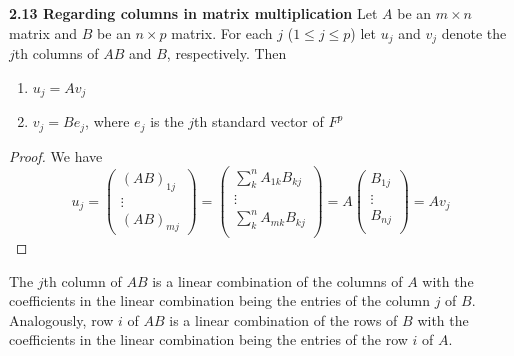 \documentclass[11pt]{article}
\begin{document}
\begin{theorem*}
    \textbf{2.13 Regarding columns in matrix multiplication} Let $A$ be an $m\times n$ matrix and $B$ be an $n\times p$ matrix. For each $j$ ($1\leq j \leq p$) let $u_j$ and $v_j$ denote the $j$th columns of $AB$ and $B$, respectively. Then
    \begin{enumerate}
        \item $u_j = Av_j$ 
        \item $v_j = Be_j$, where $e_j$ is the $j$th standard vector of $F^p$
    \end{enumerate}
    \begin{proof}
        We have 
        \[
            u_j = 
            \begin{pmatrix}
                (AB)_{1j} \\ \vdots \\ (AB)_{mj}    
            \end{pmatrix}    
            =
            \begin{pmatrix}
                \sum_k^n A_{1k} B_{kj} \\
                \vdots \\
                \sum_k^n A_{mk} B_{kj} \\ 
            \end{pmatrix}
            = 
            A
            \begin{pmatrix}
                B_{1j} \\
                \vdots \\
                B_{nj} \\ 
            \end{pmatrix}
            = Av_j
        \]
    \end{proof}
\end{theorem*}


\begin{corollary*}
    The $j$th column of $AB$ is a linear combination of the columns of $A$ with the coefficients in the linear combination being the entries of the column $j$ of $B$. Analogously, row $i$ of $AB$ is a linear combination of the rows of $B$ with the coefficients in the linear combination being the entries of the row $i$ of $A$.
\end{corollary*}
\end{document}

